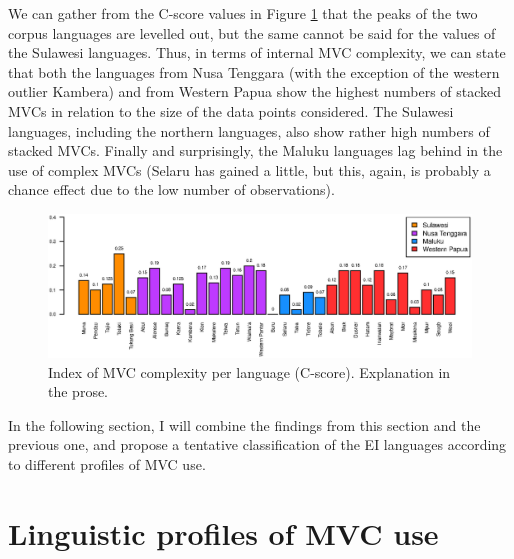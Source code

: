 We can gather from the C-score values in Figure \ref{fig:complexity} that the peaks of the two corpus languages are levelled out, but the same cannot be said for the values of the Sulawesi languages. Thus, in terms of internal MVC complexity, we can state that both the languages from Nusa Tenggara (with the exception of the western outlier Kambera) and from Western Papua show the highest numbers of stacked MVCs in relation to the size of the data points considered. The Sulawesi languages, including the northern languages, also show rather high numbers of stacked MVCs. Finally and surprisingly, the Maluku languages lag behind in the use of complex MVCs (Selaru has gained a little, but this, again, is probably a chance effect due to the low number of observations). 

\begin{figure}
\includegraphics[width=\textwidth]{figures/index_MVCcomplexity_clean.eps}
\caption[Index of MVC complexity per language]{Index of MVC complexity per language (C-score). Explanation in the prose.}\label{fig:complexity}
\end{figure}

In the following section, I will combine the findings from this section and the previous one, and propose a tentative classification of the EI languages according to different profiles of MVC use.

\section{Linguistic profiles of MVC use} \label{sec:profile_use}

